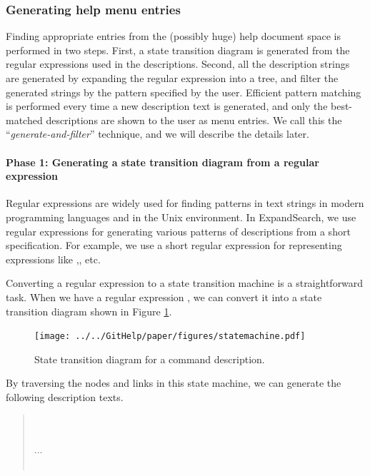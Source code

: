 \documentclass[manuscript,anonymous,review]{acmart}
\def\ES{\textsf{ExpandSearch}}
\begin{document}
\subsubsection{Generating help menu entries}

Finding appropriate entries from the (possibly huge) help document space is
performed in two steps.
First, a state transition diagram is generated from the regular expressions
used in the descriptions.
Second, all the description strings are generated by expanding the regular expression
into a tree, and filter the generated strings by the pattern specified by the user.
Efficient pattern matching is performed every time a new description text is generated,
and only the best-matched descriptions are shown to the user as menu entries.
We call this the ``\textit{generate-and-filter}'' technique,
and we will describe the details later.

\paragraph{Phase 1: Generating a state transition diagram from a regular expression}

Regular expressions are widely used for finding patterns in text strings
in modern programming languages and in the Unix environment.
In {\ES}, we use regular expressions for
generating various patterns of descriptions from a short specification.
For example, we use a short regular expression
for representing expressions like
,, etc.

Converting a regular expression to a state transition machine is a
straightforward task.
When we have a regular expression
, 
we can convert it into a state transition diagram
shown in Figure \ref{statemachine1}.

\begin{figure}[htb]
\texttt{[image: ../../GitHelp/paper/figures/statemachine.pdf]}
\caption{State transition diagram for a  command description.}
\label{statemachine1}
\end{figure}

By traversing the nodes and links in this state machine,
we can generate the following description texts.

\begin{quote}
\small
{} \\
 \\
...\\
\\
\end{quote}
\end{document}
